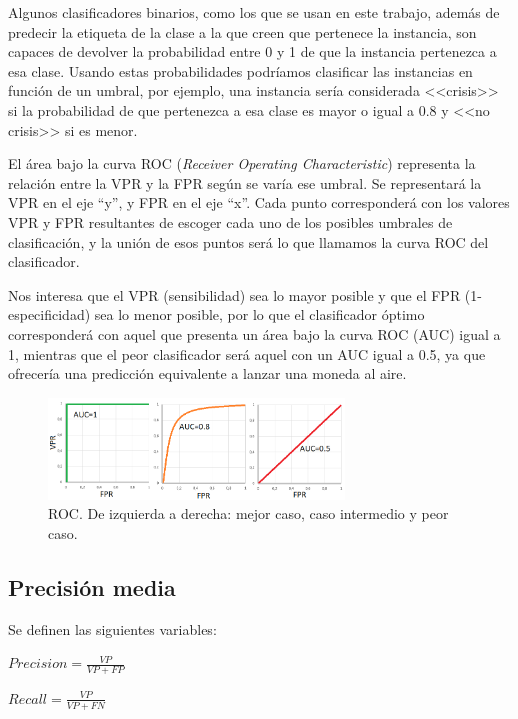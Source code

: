 Algunos clasificadores binarios, como los que se usan en este trabajo, además de predecir la etiqueta de la clase a la que creen que pertenece la instancia, son capaces de devolver la probabilidad entre 0 y 1 de que la instancia pertenezca a esa clase. Usando estas probabilidades podríamos clasificar las instancias en función de un umbral, por ejemplo, una instancia sería considerada <<crisis>> si la probabilidad de que pertenezca a esa clase es mayor o igual a 0.8 y <<no crisis>> si es menor. 

El área bajo la curva ROC (\textit{Receiver Operating Characteristic}) representa la relación entre la VPR y la FPR según se varía ese umbral. Se representará la VPR en el eje ``y'', y FPR en el eje ``x''. Cada punto corresponderá con los valores VPR y FPR resultantes de escoger cada uno de los posibles umbrales de clasificación, y la unión de esos puntos será lo que llamamos la curva ROC del clasificador.

Nos interesa que el VPR (sensibilidad) sea lo mayor posible y que el FPR (1-especificidad) sea lo menor posible, por lo que el clasificador óptimo corresponderá con aquel que presenta un área bajo la curva ROC (AUC) igual a 1, mientras que el peor clasificador será aquel con un AUC igual a 0.5, ya que ofrecería una predicción equivalente a lanzar una moneda al aire. 

\begin{figure}[H]
	\centering
	\includegraphics[width=0.7\textwidth]{../img/roc.png}
	\caption{ROC. De izquierda a derecha: mejor caso, caso intermedio y peor caso.}
	\label{fig:roc}
\end{figure} 

\subsection{Precisión media}

Se definen las siguientes variables: 
\begin{center}
	$Precision=\frac{VP}{VP+FP}$
\end{center}
\begin{center}
	$Recall=\frac{VP}{VP+FN}$
\end{center}

